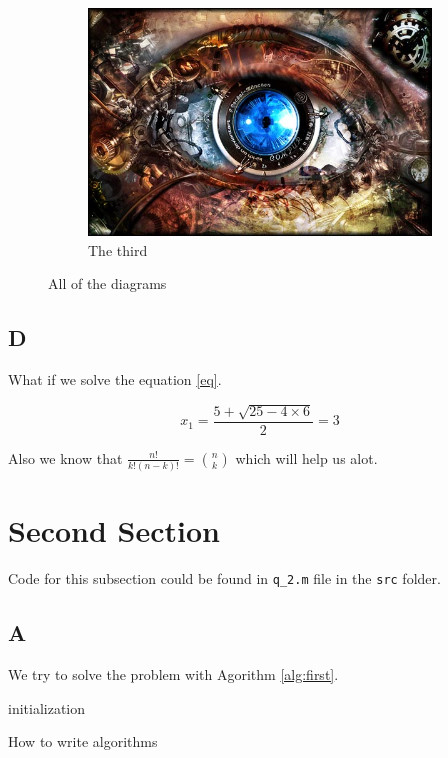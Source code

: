 \documentclass[11pt,a4paper]{article}
\begin{document}
\begin{figure}[!h]
    \begin{subfigure}[h]{0.3\textwidth}
        \includegraphics[width=\textwidth]{img}
        \caption{The third}
    \end{subfigure}

    \caption{All of the diagrams}
    \label{fig:multi}
\end{figure}


\subsection{D}
What if we solve the equation \ref{eq}.

\begin{equation}
\label{eq}
x_1 = \frac{5 + \sqrt{25 - 4 \times 6}}{2} = 3
\end{equation}

Also we know that
$
\frac{n!}{k!(n-k)!} = \binom{n}{k}
$ which will help us alot.

\section{Second Section}

Code for this subsection could be found in \texttt{q\_2.m} file in the \texttt{src} folder.

\subsection{A}
We try to solve the problem with Agorithm \ref{alg:first}.

\begin{algorithm}[H]
    \SetAlgoLined
    initialization\;
    \caption{How to write algorithms}
    \label{alg:first}
\end{algorithm}
\end{document}
